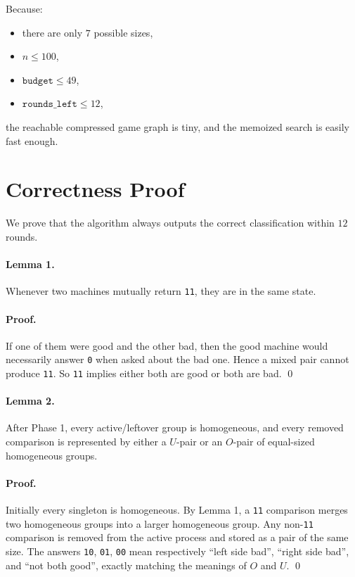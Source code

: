\documentclass[11pt]{article}
\begin{document}
Because:

\begin{itemize}[leftmargin=*]
    \item there are only $7$ possible sizes,
    \item $n \le 100$,
    \item $\texttt{budget} \le 49$,
    \item $\texttt{rounds\_left} \le 12$,
\end{itemize}

the reachable compressed game graph is tiny, and the memoized search is easily fast enough.

\section*{Correctness Proof}

We prove that the algorithm always outputs the correct classification within $12$ rounds.

\paragraph{Lemma 1.}
Whenever two machines mutually return \texttt{11}, they are in the same state.

\paragraph{Proof.}
If one of them were good and the other bad, then the good machine would necessarily answer \texttt{0} when asked about the bad one. Hence a mixed pair cannot produce \texttt{11}. So \texttt{11} implies either both are good or both are bad. \qed

\paragraph{Lemma 2.}
After Phase 1, every active/leftover group is homogeneous, and every removed comparison is represented by either a $U$-pair or an $O$-pair of equal-sized homogeneous groups.

\paragraph{Proof.}
Initially every singleton is homogeneous. By Lemma 1, a \texttt{11} comparison merges two homogeneous groups into a larger homogeneous group. Any non-\texttt{11} comparison is removed from the active process and stored as a pair of the same size. The answers \texttt{10}, \texttt{01}, \texttt{00} mean respectively ``left side bad'', ``right side bad'', and ``not both good'', exactly matching the meanings of $O$ and $U$. \qed
\end{document}
